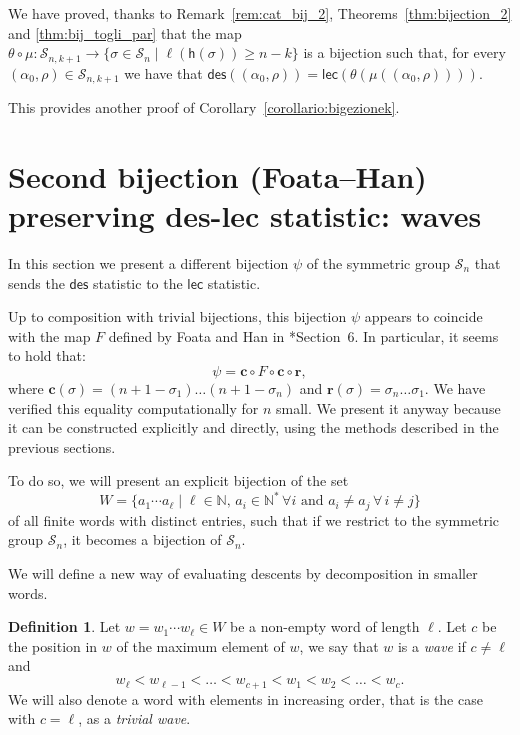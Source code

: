 \documentclass[a4paper]{amsart}
\newcommand{\des}{\mathsf{des}}
\newcommand{\lec}{\mathsf{lec}}
\newcommand{\h}{\mathsf{h}}
\theoremstyle{definition}
\newtheorem{definition}[theorem]{Definition}
\theoremstyle{remark}
\numberwithin{equation}{section}
\begin{document}
We have proved, thanks to Remark~\ref{rem:cat_bij_2}, Theorems~\ref{thm:bijection_2} and \ref{thm:bij_togli_par} that the map $\theta\circ\mu:\mathcal{S}_{n,k+1}\to\{\sigma\in\mathcal{S}_n\mid\ell(\h(\sigma))\geq n-k\}$ is a bijection such that, for every $(\alpha_0,\rho)\in\mathcal{S}_{n,k+1}$ we have that $\des((\alpha_0,\rho))=\lec(\theta(\mu((\alpha_0,\rho))))$.

This provides another proof of Corollary~\ref{corollario:bigezionek}.

\section{Second bijection (Foata--Han) preserving des-lec statistic: waves}
\label{sec:foata}
In this section we present a different  bijection $\psi$ of the symmetric group $\mathcal{S}_n$ that sends the $\des$ statistic to the $\lec$ statistic. 

Up to composition with trivial bijections, this bijection $\psi$ appears to coincide with the map $F$ defined by Foata and Han in \cite{FH08}*{Section~6}. In particular, it seems to hold that:
\begin{equation}
    \psi=\mathbf{c}\circ F \circ \mathbf{c}\circ\mathbf{r},
\end{equation}
where $\mathbf{c}(\sigma)=(n+1-\sigma_1)\dots(n+1-\sigma_n)$ and $\mathbf{r}(\sigma)=\sigma_n\dots\sigma_1$. We have verified this equality computationally for $n$ small. We present it anyway because it can be constructed explicitly and directly, using the methods described in the previous sections.

To do so, we will present an explicit bijection of the set $$W=\{a_1\cdots a_{\ell}\mid \ell\in\mathbb{N},\,a_i\in\mathbb{N}^*\,\forall i\text{ and }a_i\neq a_j\,\forall\, i\neq j\}$$ of all finite words with distinct entries, such that if we restrict to the symmetric group $\mathcal{S}_n$, it becomes a bijection of $\mathcal{S}_n$. 

We will define a new way of evaluating descents by decomposition in smaller words.

\begin{definition}
    Let $w=w_1\cdots w_{\ell}\in W$ be a non-empty word of length $\ell$. Let $c$ be the position in $w$ of the maximum element of $w$, we say that $w$ is a \textit{wave} if $c\neq\ell$ and 
    \begin{equation}
        w_{\ell}<w_{\ell-1}<\dots<w_{c+1}<w_1<w_2<\dots<w_c.
    \end{equation}
    We will also denote a word with elements in increasing order, that is the case with $c=\ell$, as a \textit{trivial wave}.
\end{definition}
\end{document}
